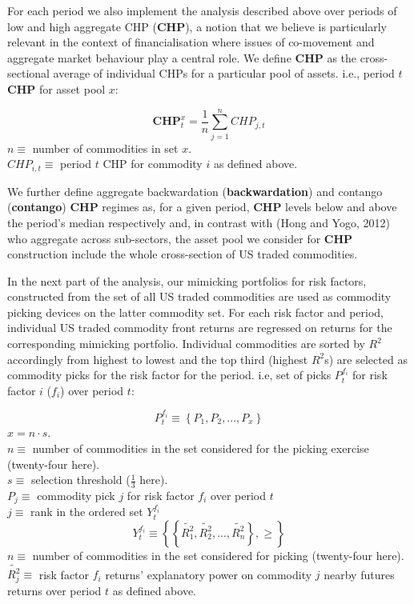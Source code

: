 \documentclass[]{elsarticle} %
\begin{document}
For each period we also implement the analysis described above over periods of low and high aggregate CHP (\textbf{CHP}), a notion that we believe is particularly relevant in the context of financialisation where issues of co-movement and aggregate market behaviour play a central role. We define \textbf{CHP} as the cross-sectional average of individual CHPs for a particular pool of assets. i.e., period \(t\) \textbf{CHP} for asset pool \(x\):

\[\mathbf{CHP}_{t}^{x}=\frac{1}{n}\sum_{j=1}^{n}CHP_{j,t}\]
\(n\equiv\) number of commodities in set \(x\).\\
\(CHP_{i,t}\equiv\) period \(t\) CHP for commodity \(i\) as defined above.

\medskip\setlength{\parindent}{0pt}

We further define aggregate backwardation (\textbf{backwardation}) and contango (\textbf{contango}) \textbf{CHP} regimes as, for a given period, \textbf{CHP} levels below and above the period's median respectively and, in contrast with (Hong and Yogo, 2012) who aggregate across sub-sectors, the asset pool we consider for \textbf{CHP} construction include the whole cross-section of US traded commodities.

\medskip\setlength{\parindent}{0pt}

In the next part of the analysis, our mimicking portfolios for risk factors, constructed from the set of all US traded commodities are used as commodity picking devices on the latter commodity set. For each risk factor and period, individual US traded commodity front returns are regressed on returns for the corresponding mimicking portfolio. Individual commodities are sorted by \(R^{2}\) accordingly from highest to lowest and the top third (highest \(R^{2}\)s) are selected as commodity picks for the risk factor for the period. i.e, set of picks \(P_{t}^{f_{i}}\) for risk factor \(i\) (\(f_{i}\)) over period \(t\):

\[P_{t}^{f_{i}}\equiv\left \{ P_{1}, P_{2}, ..., P_{x} \right \}\]
\(x = n \cdot s\).\\
\(n\equiv\) number of commodities in the set considered for the picking exercise (twenty-four here).\\
\(s\equiv\) selection threshold (\(\frac{1}{3}\) here).\\
\(P_{j}\equiv\) commodity pick \(j\) for risk factor \(f_{i}\) over period \(t\)\\
\(j\equiv\) rank in the ordered set \(Y_{t}^{f_{i}}\)\\
\[Y_{t}^{f_{i}}\equiv\left \{ \left \{ \tilde{R_{1}^{2}}, \tilde{R_{2}^{2}}, ..., \tilde{R_{n}^{2}} \right \}, \geq \right \}\]
\(n\equiv\) number of commodities in the set considered for picking (twenty-four here).\\
\(\tilde{R_{j}^{2}}\equiv\) risk factor \(f_{i}\) returns' explanatory power on commodity \(j\) nearby futures returns over period \(t\) as defined above.
\end{document}
